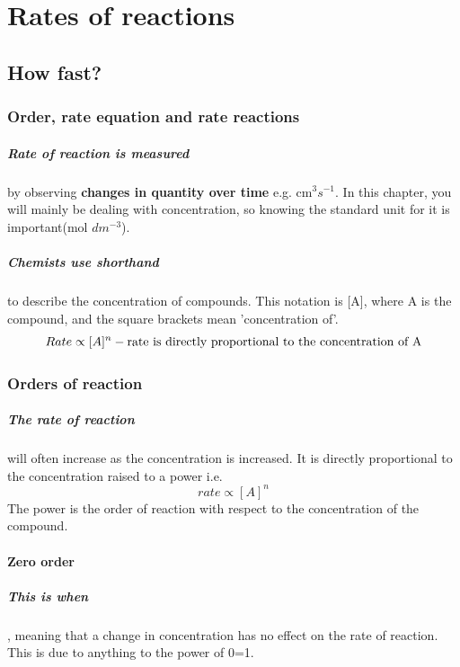\chapter{Rates of reactions}
\section{How fast?}
\subsection{Order, rate equation and rate reactions}
\paragraph{Rate of reaction is measured} by observing \textbf{changes in quantity over time} e.g. cm$^3 s^{-1} $. In this chapter, you will mainly be dealing with concentration, so knowing the standard unit for it is important(mol $ dm^{-3}$).
\paragraph{Chemists use shorthand} to describe the concentration of compounds. This notation is [A], where A is the compound, and the square brackets mean 'concentration of'.
\begin{equation}
Rate \propto [A]^n - \textnormal{rate is directly proportional to the concentration of A}
\end{equation}
\subsection{Orders of reaction}
\paragraph{The rate of reaction}will often increase as the concentration is increased. It is directly proportional to the concentration raised to a power i.e.
\begin{equation}
rate\propto [A]^n
\end{equation}
The power is the order of reaction with respect to the concentration of the compound.
\subsubsection{Zero order}
\paragraph{This is when}, meaning that a change in concentration has no effect on the rate of reaction. This is due to anything to the power of 0=1. 
